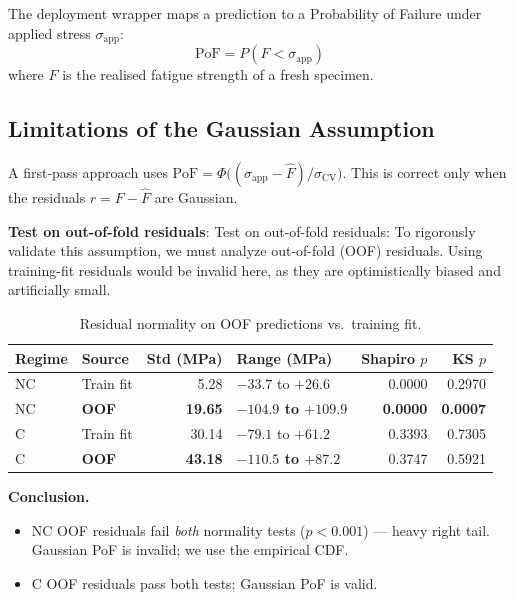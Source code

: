 \documentclass[12pt,a4paper]{article}
\begin{document}
The deployment wrapper maps a prediction to a Probability of Failure under applied stress
$\sigma_{\text{app}}$:
\[
  \text{PoF} = P(F < \sigma_{\text{app}})
\]
where $F$ is the realised fatigue strength of a fresh specimen.

\subsection{Limitations of the Gaussian Assumption}
A first-pass approach uses
$\text{PoF} = \Phi\!\big((\sigma_{\text{app}} - \hat{F}) / \sigma_{\text{CV}}\big)$.
This is correct only when the residuals $r = F - \hat{F}$ are Gaussian.

\textbf{Test on out-of-fold residuals}: Test on out-of-fold residuals: To rigorously 
validate this assumption, we must analyze out-of-fold (OOF) residuals. Using training-fit 
residuals would be invalid here, as they are optimistically biased and artificially small.

\begin{table}[H]
\centering
\caption{Residual normality on OOF predictions vs.\ training fit.}
\label{tab:residuals}
\setlength{\tabcolsep}{5pt}
\begin{tabular}{l l r p{3.4cm} r r}
\toprule
\textbf{Regime} & \textbf{Source} & \textbf{Std (MPa)}
                & \textbf{Range (MPa)} & \textbf{Shapiro $p$} & \textbf{KS $p$} \\
\midrule

NC & Train fit            &  5.28 & $-33.7$ to $+26.6$    & 0.0000 & 0.2970 \\
NC & \textbf{OOF}         & \textbf{19.65} & \textbf{$-104.9$ to $+109.9$}
                                                           & \textbf{0.0000} & \textbf{0.0007} \\
C  & Train fit            & 30.14 & $-79.1$ to $+61.2$    & 0.3393 & 0.7305 \\
C  & \textbf{OOF}         & \textbf{43.18} & \textbf{$-110.5$ to $+87.2$}
                                                           & 0.3747 & 0.5921 \\
\bottomrule
\end{tabular}
\end{table}

\textbf{Conclusion.}
\begin{itemize}[nosep]
  \item NC OOF residuals fail \emph{both} normality tests ($p < 0.001$) — heavy right tail.
        Gaussian PoF is invalid; we use the empirical CDF.
  \item C OOF residuals pass both tests; Gaussian PoF is valid.
\end{itemize}
\end{document}
